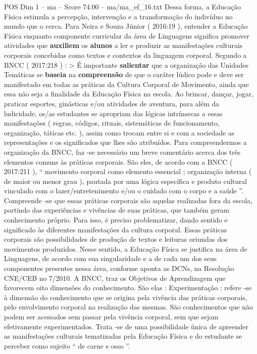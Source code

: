 \begin{textsample}{POS Dim 1 – ma – Score 74.00 – ma/ma\_ef\_16.txt}
Dessa forma, a Educação Física estimula a percepção, intervenção e a transformação do indivíduo no mundo que o cerca.
Para Neira e Souza Júnior ( 2016:19 ), entender a Educação Física enquanto componente curricular da área de Linguagens significa promover atividades que \textbf{auxiliem} os \textbf{alunos} a ler e produzir as manifestações culturais corporais concebidas como textos e contextos da linguagem corporal.
Segundo a BNCC ( 2017:218 ) : > É importante \textbf{salientar} que a organização das Unidades Temáticas se \textbf{baseia} na \textbf{compreensão} de que o caráter lúdico pode e deve ser manifestado em todas as práticas da Cultura Corporal de Movimento, ainda que essa não seja a finalidade da Educação Física na escola.
Ao brincar, dançar, jogar, praticar esportes, ginásticas e/ou atividades de aventura, para além da ludicidade, os/as estudantes se apropriam das lógicas intrínsecas a essas manifestações ( regras, códigos, rituais, sistemáticas de funcionamento, organização, táticas etc. ), assim como trocam entre si e com a sociedade as representações e os significados que lhes são atribuídos.
Para compreendermos a organização da BNCC, faz -se necessário um breve comentário acerca dos três elementos comuns às práticas corporais.
São eles, de acordo com a BNCC ( 2017:211 ), “ movimento corporal como elemento essencial ; organização interna ( de maior ou menor grau ), pautada por uma lógica específica e produto cultural vinculado com o lazer/entretenimento e/ou o cuidado com o corpo e a saúde ”.
Compreende -se que essas práticas corporais são aquelas realizadas fora da escola, partindo das experiências e vivências de suas práticas, que também geram conhecimento próprio.
Para isso, é preciso problematizar, dando sentido e significado às diferentes manifestações da cultura corporal.
Essas práticas corporais são possibilidades de produção de textos e leituras oriundas dos movimentos produzidos.
Nesse sentido, a Educação Física se justifica na área de Linguagens, de acordo com sua singularidade e a de cada um dos seus componentes presentes nessa área, conforme aponta as DCNs, na Resolução CNE/CEB no 7/2010.
A BNCC, traz os Objetivos de Aprendizagem que favorecem oito dimensões do conhecimento.
São elas : Experimentação : refere -se à dimensão do conhecimento que se origina pela vivência das práticas corporais, pelo envolvimento corporal na realização das mesmas.
São conhecimentos que não podem ser acessados sem passar pela vivência corporal, sem que sejam efetivamente experimentados.
Trata -se de uma possibilidade única de apreender as manifestações culturais tematizadas pela Educação Física e do estudante se perceber como sujeito “ de carne e osso ”.

\end{textsample}
